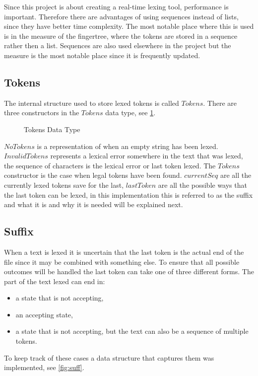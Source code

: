 Since this project is about creating a real-time lexing tool, performance is
important. Therefore there are advantages of using sequences instead of lists,
since they have better time complexity. The most notable place where this is
used is in the measure of the fingertree, where the tokens are stored in a
sequence rather then a list. Sequences are also used elsewhere in the project
but the measure is the most notable place since it is frequently updated.

\subsection{Tokens}
The internal structure used to store lexed tokens is called $Tokens$. There are
three constructors in the $Tokens$ data type, see \cref{fig:tokens}.

\begin{figure}[h!]
  
  \caption{Tokens Data Type\label{fig:tokens}}
\end{figure}

$NoTokens$ is a representation of when an empty string has been lexed.
$InvalidTokens$ represents a lexical error somewhere in the text that was lexed,
the sequence of characters is the lexical error or last token lexed. The
$Tokens$ constructor is the case when legal tokens have been found. $currentSeq$
are all the currently lexed tokens save for the last, $lastToken$ are all the
possible ways that the last token can be lexed, in this implementation this is
referred to as the suffix and what it is and why it is needed will be explained
next.

\subsection{Suffix}\label{sub:suff}
When a text is lexed it is uncertain that the last token is the actual end of
the file since it may be combined with something else. To ensure that all
possible outcomes will be handled the last token can take one of three
different forms. The part of the text lexed can end in:
\begin{itemize}
\item a state that is not accepting,
\item an accepting state,
\item a state that is not accepting, but the text can also be a sequence
  of multiple tokens.
\end{itemize}
To keep track of these cases a data structure that captures them was
implemented, see \cref{fig:suff}.

